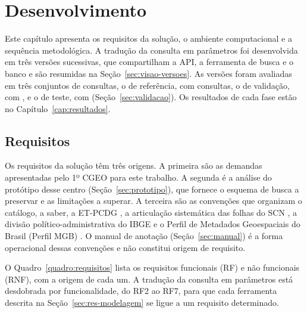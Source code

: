 \chapter{Desenvolvimento}
\label{cap:desenvolvimento}

Este capítulo apresenta os requisitos da solução, o ambiente computacional e a sequência metodológica. A tradução da consulta em parâmetros foi desenvolvida em três versões sucessivas, que compartilham a API, a ferramenta de busca e o banco e são resumidas na Seção~\ref{sec:visao-versoes}. As versões foram avaliadas em três conjuntos de consultas, o de referência, com  consultas, o de validação, com , e o de teste, com  (Seção~\ref{sec:validacao}). Os resultados de cada fase estão no Capítulo~\ref{cap:resultados}.

\section{Requisitos}
\label{sec:requisitos}

Os requisitos da solução têm três origens. A primeira são as demandas apresentadas pelo 1º CGEO para este trabalho. A segunda é a análise do protótipo desse centro (Seção~\ref{sec:prototipo}), que fornece o esquema de busca a preservar e as limitações a superar. A terceira são as convenções que organizam o catálogo, a saber, a ET-PCDG \cite{etpcdg2016}, a articulação sistemática das folhas do SCN \cite{scn2016}, a divisão político-administrativa do IBGE e o Perfil de Metadados Geoespaciais do Brasil (Perfil MGB) \cite{perfilmgb2009}. O manual de anotação (Seção~\ref{sec:manual}) é a forma operacional dessas convenções e não constitui origem de requisito.

O Quadro~\ref{quadro:requisitos} lista os requisitos funcionais (RF) e não funcionais (RNF), com a origem de cada um. A tradução da consulta em parâmetros está desdobrada por funcionalidade, do RF2 ao RF7, para que cada ferramenta descrita na Seção~\ref{sec:res-modelagem} se ligue a um requisito determinado.

